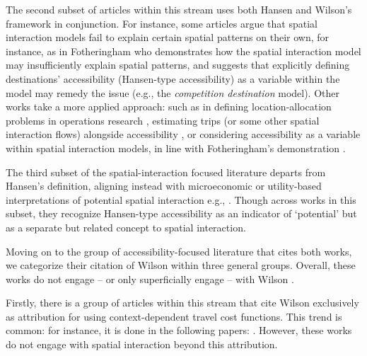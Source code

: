 \documentclass[
  10pt,
  letterpaper,
]{article}
\begin{document}
The second subset of articles within this stream uses both Hansen
\citep{hansen1959} and Wilson's \citep{wilson1971} framework in
conjunction. For instance, some articles argue that spatial interaction
models fail to explain certain spatial patterns on their own, for
instance, as in Fotheringham
\citep{fotheringhamSpatialCompetitionAgglomeration1985} who demonstrates
how the spatial interaction model may insufficiently explain spatial
patterns, and suggests that explicitly defining destinations'
accessibility (Hansen-type accessibility) as a variable within the model
may remedy the issue (e.g., the \emph{competition destination} model).
Other works take a more applied approach: such as in defining
location-allocation problems in operations research
\citep{leonardiOptimumFacilityLocation1978, beaumontLocationallocationProblemsPlane1981},
estimating trips (or some other spatial interaction flows) alongside
accessibility
\citep[e.g.,][]{clarke2002deriving, grengs2004measuring, turk2019socio},
or considering accessibility as a variable within spatial interaction
models, in line with Fotheringham's
\citep{fotheringhamSpatialCompetitionAgglomeration1985} demonstration
\citep[e.g.,][]{beckers2022incorporating}.

The third subset of the spatial-interaction focused literature departs
from Hansen's \citep{hansen1959} definition, aligning instead with
microeconomic or utility-based interpretations of potential spatial
interaction e.g.,
\citep{morrisAccessibilityIndicatorsTransport1979, leonardiRandomUtilityDemand1984}.
Though across works in this subset, they recognize Hansen-type
accessibility as an indicator of `potential' but as a separate but
related concept to spatial interaction.

Moving on to the group of accessibility-focused literature that cites
both works, we categorize their citation of Wilson \citep{wilson1971}
within three general groups. Overall, these works do not engage -- or
only superficially engage -- with Wilson \citep{wilson1971}.

Firstly, there is a group of articles within this stream that cite
Wilson \citep{wilson1971} exclusively as attribution for using
context-dependent travel cost functions. This trend is common: for
instance, it is done in the following papers:
\citep{handyMeasuringAccessibilityExploration1997, weibullNumericalMeasurementAccessibility1980, kwan1998space, shenLocationCharacteristicsInnercity1998, ashiru2003space, rau2012spatial, pan2013impacts, margaridacondecomelhoradoImpactMeasuringInternal2016, caschili2015accessibility, grengs2015nonwork, pan2020measuring, chia2020extending, roblot2021participation, sharifiasl2023incorporating, kharel2024examining}.
However, these works do not engage with spatial interaction beyond this
attribution.
\end{document}
